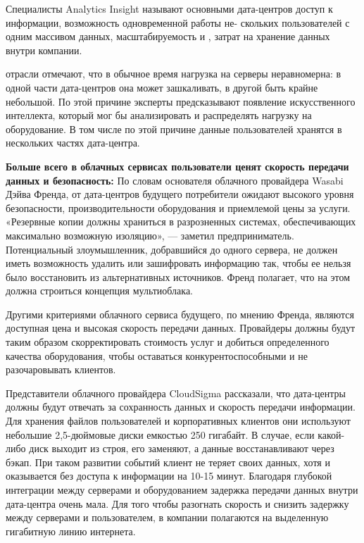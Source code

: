 Специалисты Analytics Insight называют основными   дата-центров  доступ к информации, возможность одновременной работы не- скольких пользователей с одним массивом данных, масштабируемость и ,  затрат на хранение данных внутри компании.

 отрасли отмечают, что в обычное время нагрузка на серверы неравномерна: в одной части дата-центров она может зашкаливать, в другой быть крайне небольшой. По этой причине эксперты предсказывают появление искусственного интеллекта, который мог бы анализировать и распределять нагрузку на оборудование. В том числе по этой причине данные пользователей хранятся в нескольких частях дата-центра.

\textbf{Больше всего в облачных сервисах пользователи ценят скорость передачи данных и безопасность:} По словам основателя облачного провайдера Wasabi Дэйва Френда, от дата-центров будущего потребители ожидают высокого уровня безопасности, производительности оборудования и приемлемой цены за услуги. «Резервные копии должны храниться в разрозненных системах, обеспечивающих максимально возможную изоляцию», --- заметил предприниматель. Потенциальный злоумышленник, добравшийся до одного сервера, не должен иметь возможность удалить или зашифровать информацию так, чтобы ее нельзя было восстановить из альтернативных источников. Френд полагает, что на этом должна строиться концепция мультиоблака.

Другими критериями облачного сервиса будущего, по мнению Френда, являются доступная цена и высокая скорость передачи данных. Провайдеры должны будут таким образом скорректировать стоимость услуг и добиться определенного качества оборудования, чтобы оставаться конкурентоспособными и не разочаровывать клиентов.

Представители облачного провайдера CloudSigma рассказали, что дата-центры должны будут отвечать за сохранность данных и скорость передачи информации. Для хранения файлов пользователей и корпоративных клиентов они используют небольшие 2,5-дюймовые диски емкостью 250 гигабайт. В случае, если какой-либо диск выходит из строя, его заменяют, а данные восстанавливают через бэкап. При таком развитии событий клиент не теряет своих данных, хотя и оказывается без доступа к информации на 10-15 минут. Благодаря глубокой интеграции между серверами и оборудованием задержка передачи данных внутри дата-центра очень мала. Для того чтобы разогнать скорость и снизить задержку между серверами и пользователем, в компании полагаются на выделенную гигабитную линию интернета.


